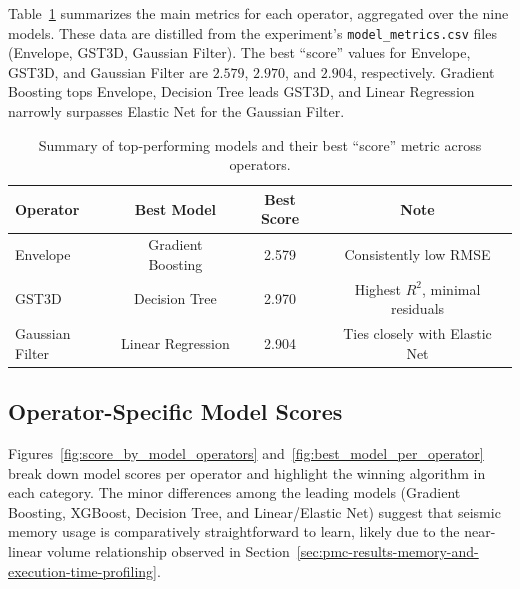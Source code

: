 Table~\ref{tab:performance_summary} summarizes the main metrics for each operator, aggregated over the nine models.
These data are distilled from the experiment’s \texttt{model\_metrics.csv} files (Envelope, \ac{GST3D}, Gaussian Filter).
The best “score” values for Envelope, \ac{GST3D}, and Gaussian Filter are $2.579$, $2.970$, and $2.904$, respectively.
Gradient Boosting tops Envelope, Decision Tree leads \ac{GST3D}, and Linear Regression narrowly surpasses Elastic Net for the Gaussian Filter.

\begin{table}[htbp]
    \centering
    \begin{tabular}{lccc}
        \hline
        \textbf{Operator} & \textbf{Best Model} & \textbf{Best Score} & \textbf{Note}                    \\
        \hline
        Envelope          & Gradient Boosting   & 2.579               & Consistently low RMSE            \\
        \ac{GST3D}        & Decision Tree       & 2.970               & Highest $R^2$, minimal residuals \\
        Gaussian Filter   & Linear Regression   & 2.904               & Ties closely with Elastic Net    \\
        \hline
    \end{tabular}
    \caption{Summary of top-performing models and their best “score” metric across operators.}
    \label{tab:performance_summary}
\end{table}

\subsection{Operator-Specific Model Scores}
\label{subsec:operator-specific-model-scores}

Figures~\ref{fig:score_by_model_operators} and~\ref{fig:best_model_per_operator} break down model scores per operator and highlight the winning algorithm in each category.
The minor differences among the leading models (Gradient Boosting, XGBoost, Decision Tree, and Linear/Elastic Net) suggest that seismic memory usage is comparatively straightforward to learn, likely due to the near-linear volume relationship observed in Section~\ref{sec:pmc-results-memory-and-execution-time-profiling}.

